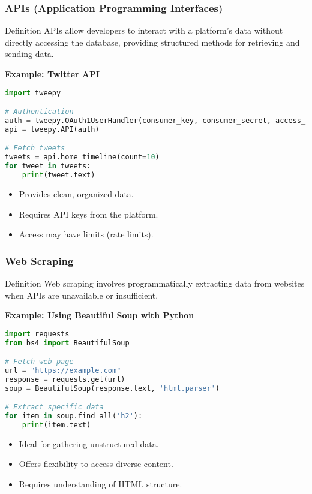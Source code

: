 \documentclass{beamer}
\begin{document}
\begin{frame}[fragile]
    \frametitle{APIs (Application Programming Interfaces)}
    \begin{block}{Definition}
        APIs allow developers to interact with a platform's data without directly accessing the database, providing structured methods for retrieving and sending data.
    \end{block}

    \textbf{Example: Twitter API}
    \begin{lstlisting}[language=Python]
import tweepy

# Authentication
auth = tweepy.OAuth1UserHandler(consumer_key, consumer_secret, access_token, access_token_secret)
api = tweepy.API(auth)

# Fetch tweets
tweets = api.home_timeline(count=10)
for tweet in tweets:
    print(tweet.text)
    \end{lstlisting}

    \begin{itemize}
        \item Provides clean, organized data.
        \item Requires API keys from the platform.
        \item Access may have limits (rate limits).
    \end{itemize}
\end{frame}

\begin{frame}[fragile]
    \frametitle{Web Scraping}
    \begin{block}{Definition}
        Web scraping involves programmatically extracting data from websites when APIs are unavailable or insufficient.
    \end{block}

    \textbf{Example: Using Beautiful Soup with Python}
    \begin{lstlisting}[language=Python]
import requests
from bs4 import BeautifulSoup

# Fetch web page
url = "https://example.com"
response = requests.get(url)
soup = BeautifulSoup(response.text, 'html.parser')

# Extract specific data
for item in soup.find_all('h2'):
    print(item.text)
    \end{lstlisting}

    \begin{itemize}
        \item Ideal for gathering unstructured data.
        \item Offers flexibility to access diverse content.
        \item Requires understanding of HTML structure.
    \end{itemize}
\end{frame}
\end{document}
